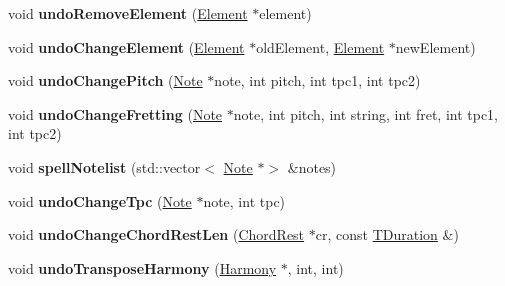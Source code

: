 \begin{DoxyCompactItemize}
\item 
\mbox{\label{class_ms_1_1_score_a365e5013395d4a660672ad8fff61a864}} 
void {\bfseries undo\+Remove\+Element} (\hyperlink{class_ms_1_1_element}{Element} $\ast$element)
\item 
\mbox{\label{class_ms_1_1_score_aa356de836bf4f8602c1bec8ec9ac798a}} 
void {\bfseries undo\+Change\+Element} (\hyperlink{class_ms_1_1_element}{Element} $\ast$old\+Element, \hyperlink{class_ms_1_1_element}{Element} $\ast$new\+Element)
\item 
\mbox{\label{class_ms_1_1_score_ab346deeb3a55ac605ff1f26fe5747bcd}} 
void {\bfseries undo\+Change\+Pitch} (\hyperlink{class_ms_1_1_note}{Note} $\ast$note, int pitch, int tpc1, int tpc2)
\item 
\mbox{\label{class_ms_1_1_score_a8e849142ce49c824684d5b733ec9adfd}} 
void {\bfseries undo\+Change\+Fretting} (\hyperlink{class_ms_1_1_note}{Note} $\ast$note, int pitch, int string, int fret, int tpc1, int tpc2)
\item 
\mbox{\label{class_ms_1_1_score_a2fd69dbe3d6edc93fcb8469b2c2f74da}} 
void {\bfseries spell\+Notelist} (std\+::vector$<$ \hyperlink{class_ms_1_1_note}{Note} $\ast$$>$ \&notes)
\item 
\mbox{\label{class_ms_1_1_score_a3386de4a92d42387f9bb6642b91b3e42}} 
void {\bfseries undo\+Change\+Tpc} (\hyperlink{class_ms_1_1_note}{Note} $\ast$note, int tpc)
\item 
\mbox{\label{class_ms_1_1_score_a0fd138463e632ae153e1175408105787}} 
void {\bfseries undo\+Change\+Chord\+Rest\+Len} (\hyperlink{class_ms_1_1_chord_rest}{Chord\+Rest} $\ast$cr, const \hyperlink{class_ms_1_1_t_duration}{T\+Duration} \&)
\item 
\mbox{\label{class_ms_1_1_score_a3527902def850d9a3244040d39e446f9}} 
void {\bfseries undo\+Transpose\+Harmony} (\hyperlink{class_ms_1_1_harmony}{Harmony} $\ast$, int, int)
\item 
\mbox{\label{class_ms_1_1_score_ab8bcd531d8973b01c2530a5d53336d8f}} 
$$
\end{DoxyCompactItemize}
